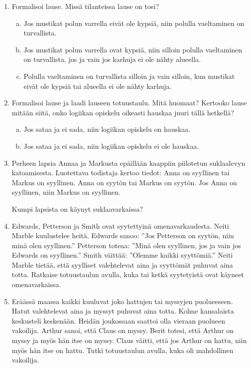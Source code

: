 \begin{enumerate}
\item Formalisoi lause. Missä tilanteissa lause on tosi?
\begin{enumerate}[a)]
\item
Jos mustikat polun varrella eivät ole kypsiä, niin polulla vaeltaminen on turvallista.
\item Jos mustikat polun varrella ovat kypsiä, niin silloin polulla vaeltaminen on turvallista, jos ja vain jos karhuja ei ole nähty alueella. 
\item Polulla vaeltaminen on turvallista silloin ja vain silloin, kun mustikat eivät ole kypsiä tai alueella ei ole nähty karhuja.
\end{enumerate}

\item Formalisoi lause ja laadi lauseen totuustaulu. Mitä huomaat? Kertooko lause mitään siitä, onko logiikan opiskelu oikeasti hauskaa juuri tällä hetkellä? 
\begin{enumerate}[a)]
\item Jos sataa ja ei sada, niin logiikan opiskelu on hauskaa.
\item Jos sataa ja ei sada, niin logiikan opiskelu ei ole hauskaa.
\end{enumerate}

\item Perheen lapsia Annaa ja Markusta epäillään kaappiin piilotetun suklaalevyn katoamisesta. Luotettava todistaja kertoo tiedot:
Anna on syyllinen tai Markus on syyllinen.
Anna on syytön tai Markus on syytön. 
Jos Anna on syyllinen, niin Markus on syyllinen.

Kumpi lapsista on käynyt suklaavarkaissa?

\item Edwards, Petterson ja Smith ovat syytettyinä omenavarkaudesta. Neiti Marble kuulustelee heitä. Edwards sanoo: ''Jos Petterson on syytön, niin minä olen syyllinen.'' Petterson toteaa: ''Minä olen syyllinen, jos ja vain jos Edwards on syyllinen.'' Smith väittää: ''Olemme kaikki syyttömiä.'' Neiti Marble tietää, että syylliset valehtelevat aina ja syyttömät puhuvat aina totta. Ratkaise totuustaulun avulla, kuka tai ketkä syytetyistä ovat käyneet omenavarkaissa.

\item Eräässä maassa kaikki kuuluvat joko hattujen tai myssyjen puolueeseen. Hatut valehtelevat aina ja myssyt puhuvat aina totta. Kolme kansalaista keskusteli keskenään. Heidän joukossaan saattoi olla vieraan puolueen vakoilija. Arthur sanoi, että Claus on myssy. Berit totesi, että Arthur on myssy ja myös hän itse on myssy. Claus väitti, että jos Arthur on hattu, niin myös hän itse on hattu. Tutki totuustaulun avulla, kuka oli mahdollinen vakoilija.


\end{enumerate}
